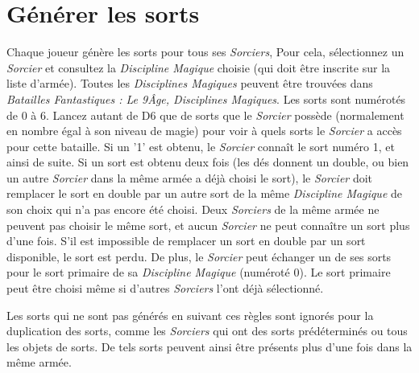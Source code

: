 \section{Générer les sorts}
\label{generation_sorts}

Chaque joueur génère les sorts pour tous ses \emph{Sorciers},  Pour cela, sélectionnez un \emph{Sorcier} et consultez la \emph{Discipline Magique} choisie (qui doit être inscrite sur la liste d'armée). Toutes les \emph{Disciplines Magiques} peuvent être trouvées dans \emph{Batailles Fantastiques : Le 9\ieme Âge, Disciplines Magiques}. Les sorts sont numérotés de 0 à 6. Lancez autant de D6 que de sorts que le \emph{Sorcier} possède (normalement en nombre égal à son niveau de magie) pour voir à quels sorts le \emph{Sorcier} a accès pour cette bataille. Si un '1' est obtenu, le \emph{Sorcier} connaît le sort numéro 1, et ainsi de suite. Si un sort est obtenu deux fois (les dés donnent un double, ou bien un autre \emph{Sorcier} dans la même armée a déjà choisi le sort), le \emph{Sorcier} doit remplacer le sort en double par un autre sort de la même \emph{Discipline Magique} de son choix qui n'a pas encore été choisi. Deux \emph{Sorciers} de la même armée ne peuvent pas choisir le même sort, et aucun \emph{Sorcier} ne peut connaître un sort plus d'une fois. S'il est impossible de remplacer un sort en double par un sort disponible, le sort est perdu. De plus, le \emph{Sorcier} peut échanger un de ses sorts pour le sort primaire de sa \emph{Discipline Magique} (numéroté 0). Le sort primaire peut être choisi même si d'autres \emph{Sorciers} l'ont déjà sélectionné.

Les sorts qui ne sont pas générés en suivant ces règles sont ignorés pour la duplication des sorts, comme les \emph{Sorciers} qui ont des sorts prédéterminés ou tous les objets de sorts. De tels sorts peuvent ainsi être présents plus d'une fois dans la même armée.
